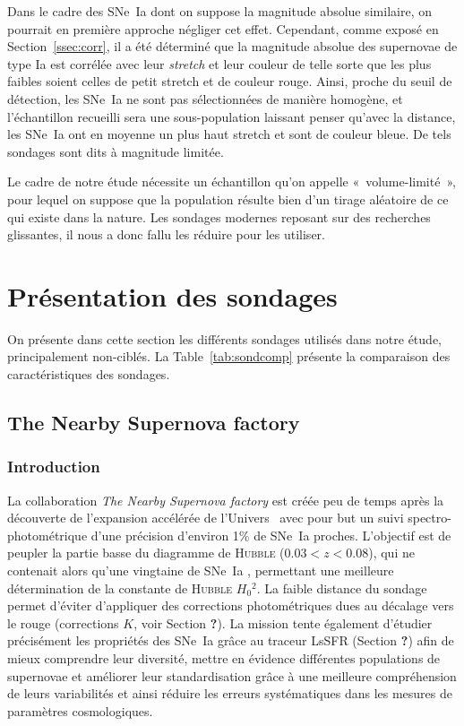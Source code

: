 \documentclass[../main/main.tex]{subfiles}
\begin{document}
Dans le cadre des SNe~Ia dont on suppose la magnitude absolue similaire, on
pourrait en première approche négliger cet effet. Cependant, comme exposé en
Section~\ref{ssec:corr}, il a été déterminé que la magnitude absolue des
supernovae de type Ia est corrélée avec leur \textit{stretch} et leur couleur de
telle sorte que les plus faibles soient celles de petit stretch et de couleur
rouge. Ainsi, proche du seuil de détection, les SNe~Ia ne sont pas sélectionnées
de manière homogène, et l'échantillon recueilli sera une sous-population
laissant penser qu'avec la distance, les SNe~Ia ont en moyenne un plus haut
stretch et sont de couleur bleue. De tels sondages sont dits à magnitude
limitée.

Le cadre de notre étude nécessite un échantillon qu'on appelle
«~volume-limité~», pour lequel on suppose que la population résulte bien d'un
tirage aléatoire de ce qui existe dans la nature. Les sondages modernes reposant
sur des recherches glissantes, il nous a donc fallu les réduire pour les
utiliser.

\section{Présentation des sondages}\label{sec:surveys}
On présente dans cette section les différents sondages utilisés dans notre
étude, principalement non-ciblés. La Table~\ref{tab:sondcomp} présente la
comparaison des caractéristiques des sondages.

\subsection{The Nearby Supernova factory}\label{ssec:snf}
\subsubsection{Introduction}\label{sssec:snfintro}

La collaboration \textit{The Nearby Supernova factory}
\citep[SNfactory,][]{aldering2002} est créée peu de temps après la découverte de
l'expansion accélérée de l'Univers~\citep{riess1998, perlmutter1999} avec pour
but un suivi spectro-photométrique d'une précision d'environ 1\% de SNe~Ia
proches. L'objectif est de peupler la partie basse du diagramme de
\textsc{Hubble} ($0.03 < z < 0.08$), qui ne contenait alors qu'une vingtaine de
SNe~Ia \citep{hamuy1996}, permettant une meilleure détermination de la constante
de \textsc{Hubble} $H_0{}^2$. La faible distance du sondage permet d'éviter
d'appliquer des corrections photométriques dues au décalage vers le rouge
(corrections $K$, voir Section \textbf{?}). La mission tente également d'étudier
précisément les propriétés des SNe~Ia grâce au traceur LsSFR (Section
\textbf{?}) afin de mieux comprendre leur diversité, mettre en évidence
différentes populations de supernovae et améliorer leur standardisation grâce à
une meilleure compréhension de leurs variabilités et ainsi réduire les erreurs
systématiques dans les mesures de paramètres cosmologiques.
\end{document}

